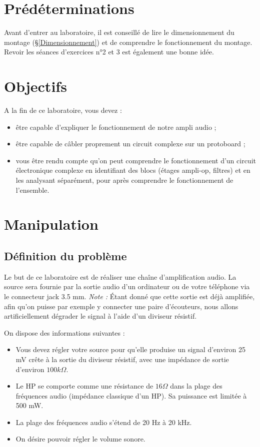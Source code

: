 \documentclass{../template/labo}
\begin{document}
\newpage
\section{Prédéterminations} %
Avant d'entrer au laboratoire, il est conseillé de lire le dimensionnement du montage (§\ref{Dimensionnement}) et de comprendre le
fonctionnement du montage. Revoir les séances d'exercices n°2 et 3 est également une bonne idée.

\section{Objectifs}
A la fin de ce laboratoire, vous devez  :
\vspace{3mm}
\begin{itemize}
\item être capable d'expliquer le fonctionnement de notre ampli audio ;
\item être capable de câbler proprement un circuit complexe sur un protoboard ;
\item vous être rendu compte qu'on peut comprendre le fonctionnement d'un circuit électronique complexe en identifiant des blocs (étages ampli-op, filtres) et en les analysant séparément, pour après comprendre le fonctionnement de l'ensemble.
\end{itemize}



\section{Manipulation}
\subsection{Définition du problème}
Le but de ce laboratoire est de réaliser une chaîne d'amplification audio.
La source sera fournie par la sortie audio d'un ordinateur ou de votre téléphone via le connecteur jack 3.5 mm.
\textit{Note : }Étant donné que cette sortie est déjà amplifiée, afin qu'on puisse par exemple y connecter une paire d'écouteurs, nous allons artificiellement dégrader le signal à l'aide d'un diviseur résistif.

On dispose des informations suivantes :
\vspace{3mm}
\begin{itemize}
\item Vous devez régler votre source pour qu'elle produise un signal d'environ 25 mV crête à la sortie du diviseur résistif, avec une impédance de sortie d'environ $100k\Omega$.
\item Le HP se comporte comme une résistance de $16\Omega$ dans la plage des fréquences audio (impédance classique d'un HP). Sa puissance est limitée à 500 mW.
\item La plage des fréquences audio s'étend de 20 Hz à 20 kHz.
\item On désire pouvoir régler le volume sonore.
\end{itemize}
\end{document}
